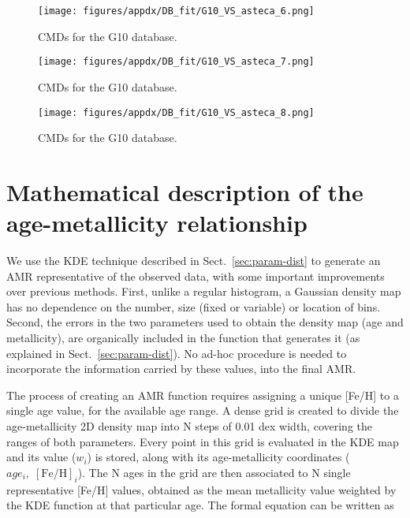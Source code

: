 \documentclass{aa}
\begin{document}
\begin{appendix}
\begin{figure*}
\texttt{[image: figures/appdx/DB\_fit/G10\_VS\_asteca\_6.png]}
\caption{CMDs for the G10 database.}
\label{fig:DBs_G10_6}
\end{figure*}
\clearpage

\begin{figure*}
\texttt{[image: figures/appdx/DB\_fit/G10\_VS\_asteca\_7.png]}
\caption{CMDs for the G10 database.}
\label{fig:DBs_G10_7}
\end{figure*}
\clearpage

\begin{figure}
\centering
\texttt{[image: figures/appdx/DB\_fit/G10\_VS\_asteca\_8.png]}
\caption{CMDs for the G10 database.}
\label{fig:DBs_G10_8}
\end{figure}





\section{Mathematical description of the age-metallicity relationship}
\label{apdx:amr_description}

We use the KDE technique described in Sect.~\ref{sec:param-dist} to
generate an AMR representative of the observed data, with some important
improvements over previous methods.
%
First, unlike a regular histogram, a Gaussian density map has no dependence on
the number, size (fixed or variable) or location of bins.
Second, the errors in the two parameters used to obtain the density map (age and
metallicity), are organically included in the function that generates it
(as explained in Sect.~\ref{sec:param-dist}). No ad-hoc procedure is needed to
incorporate the information carried by these values, into the final AMR.\@

The process of creating an AMR function
requires assigning a unique [Fe/H] to a single age value, for the available age
range.
%
A dense grid is created to divide the age-metallicity 2D density map into N
steps of 0.01 dex width, covering the ranges of both parameters. Every point in
this grid is evaluated in the KDE map and its value ($w_{i}$) is stored, along
with its age-metallicity coordinates ($age_{i},\;[\mathrm{Fe/H}]_{i}$).
%
The N ages in the grid are then associated to N single representative [Fe/H]
values, obtained as the mean metallicity value weighted by the KDE function at
that particular age. The formal equation can be written as


\end{appendix}
\end{document}
